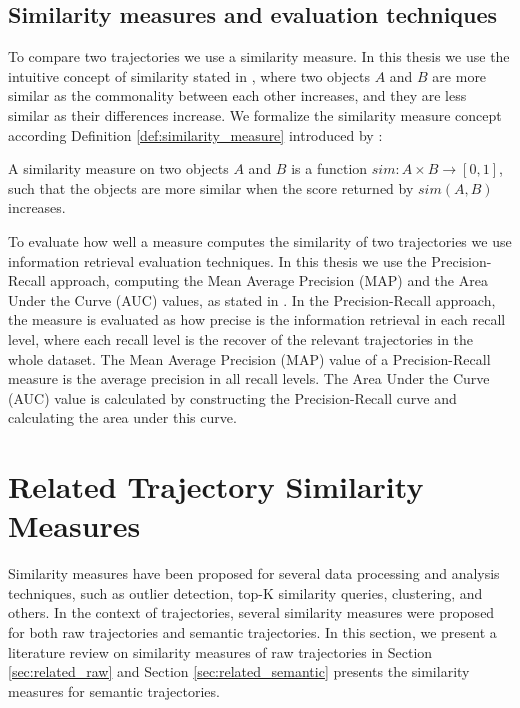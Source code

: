 \subsection{Similarity measures and evaluation techniques}\label{sec:similarity_measures}
To compare two trajectories we use a similarity measure. In this thesis we use the intuitive concept of similarity stated in \cite{lin1998information}, where two objects $A$ and $B$ are more similar as the commonality between each other increases, and they are less similar as their differences increase. We formalize the similarity measure concept according Definition \ref{def:similarity_measure} introduced by \cite{lin1998information}:

\begin{definition}
\label{def:similarity_measure}
A similarity measure on two objects $A$ and $B$ is a function $sim: A \times B \to [0,1]$, such that the objects are more similar when the score returned by $sim(A, B)$ increases.
\end{definition}

{To evaluate how well a measure computes the similarity of two trajectories we use information retrieval evaluation techniques. In this thesis we use the Precision-Recall approach, computing the Mean Average Precision (MAP) and the Area Under the Curve (AUC) values, as stated in }\cite{BaezaYatesRibeiroNeto2011}{. In the Precision-Recall approach, the measure is evaluated as how precise is the information retrieval in each recall level, where each recall level is the recover of the relevant trajectories in the whole dataset. The Mean Average Precision (MAP) value of a Precision-Recall measure is the average precision in all recall levels. The Area Under the Curve (AUC) value is calculated by constructing the Precision-Recall curve and calculating the area under this curve.}

\section{Related Trajectory Similarity Measures} \label{sec:related_measures}

Similarity measures have been proposed for several data processing and analysis techniques, such as outlier detection, top-K similarity queries, clustering, and others. In the context of trajectories, several similarity measures were proposed for both raw trajectories and semantic trajectories. In this section, we present a literature review on similarity measures of raw trajectories in Section \ref{sec:related_raw} and Section \ref{sec:related_semantic} presents the similarity measures for semantic trajectories.


